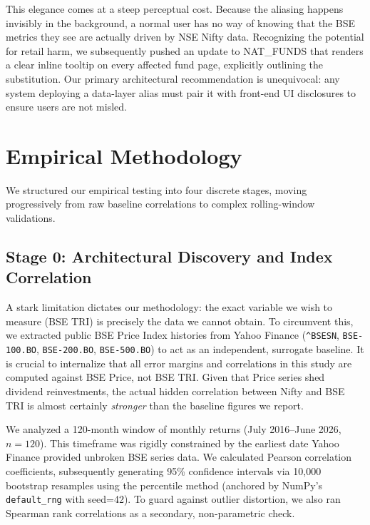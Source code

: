 \documentclass[conference]{IEEEtran}
\begin{document}
This elegance comes at a steep perceptual cost. Because the aliasing happens invisibly in the background, a normal user has no way of knowing that the BSE metrics they see are actually driven by NSE Nifty data. Recognizing the potential for retail harm, we subsequently pushed an update to NAT\_FUNDS that renders a clear inline tooltip on every affected fund page, explicitly outlining the substitution. Our primary architectural recommendation is unequivocal: any system deploying a data-layer alias must pair it with front-end UI disclosures to ensure users are not misled.

\section{Empirical Methodology}

We structured our empirical testing into four discrete stages, moving progressively from raw baseline correlations to complex rolling-window validations.

\subsection{Stage 0: Architectural Discovery and Index Correlation}
\label{sec:stage0}
A stark limitation dictates our methodology: the exact variable we wish to measure (BSE TRI) is precisely the data we cannot obtain. To circumvent this, we extracted public BSE Price Index histories from Yahoo Finance (\texttt{\^{}BSESN}, \texttt{BSE-100.BO}, \texttt{BSE-200.BO}, \texttt{BSE-500.BO}) to act as an independent, surrogate baseline. It is crucial to internalize that all error margins and correlations in this study are computed against BSE Price, not BSE TRI. Given that Price series shed dividend reinvestments, the actual hidden correlation between Nifty and BSE TRI is almost certainly \emph{stronger} than the baseline figures we report.

We analyzed a 120-month window of monthly returns (July 2016--June 2026, $n=120$). This timeframe was rigidly constrained by the earliest date Yahoo Finance provided unbroken BSE series data. We calculated Pearson correlation coefficients, subsequently generating 95\% confidence intervals via 10{,}000 bootstrap resamples using the percentile method (anchored by NumPy's \texttt{default\_rng} with seed=42). To guard against outlier distortion, we also ran Spearman rank correlations as a secondary, non-parametric check.
\end{document}

